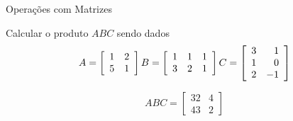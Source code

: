 \begin{exercicios}{Operações com Matrizes}
    \begin{exercicio}
        Calcular o produto $ABC$ sendo dados
        \[   A=\left[\begin{array}{rr}
                 1 & 2 \\
                 5 & 1
                \end{array}\right]
            \hfill
            B=\left[\begin{array}{rrr}
                1 & 1 & 1\\
                3 & 2 & 1
                \end{array}\right]
            \hfill
            C=\left[\begin{array}{rr}
                3 &  1 \\
                1 &  0 \\
                2 & -1
                \end{array}\right]
        \]
        \begin{answers}
            \[ ABC =   \left[
                \begin{array}{rr}
                	32 & 4 \\
                	43 & 2
                \end{array}
                \right]
            \]
        \end{answers}
    \end{exercicio}
    

\end{exercicios}

